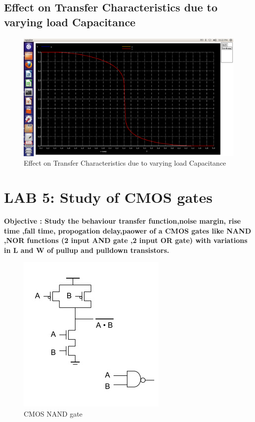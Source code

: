 \documentclass[12pt,a4paper]{article}
\begin{document}
\begin{center}
 \subsection{Effect on Transfer Characteristics due to varying load Capacitance}
 \begin{figure}[!ht]
 \centering
 \includegraphics[scale=0.35]{lab5_6pic2.png}
 \caption[Short]{Effect on Transfer Characteristics due to varying load Capacitance}
 \end{figure}



\clearpage

\section{LAB 5: Study of CMOS gates}
\bf{Objective :}
Study the behaviour transfer function,noise margin, rise time ,fall time, propogation delay,paower of a CMOS gates like NAND ,NOR functions (2 input AND gate ,2 input OR gate) with variations in L and W of pullup and pulldown transistors.

\begin{figure}[h]
\centering
\includegraphics[scale=.7]{Cmos_nand_gate.jpg}
\caption[Short]{CMOS NAND gate }
\end{figure}


\end{center}
\end{document}
